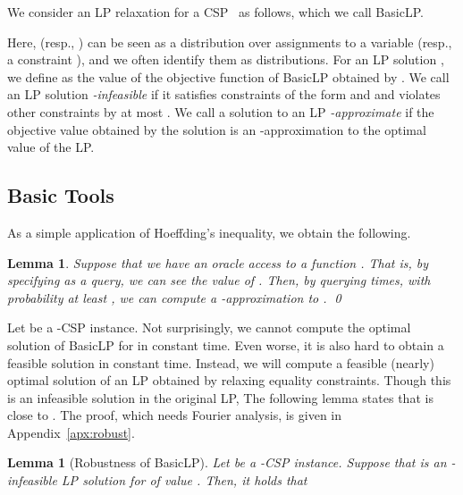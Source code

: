 \documentclass[letterpaper, 11pt]{article}
\newtheorem{lemma}[theorem]{Lemma}
\newcommand{\blp}{\textsf{BasicLP}\xspace}
\begin{document}
We consider an LP relaxation for a CSP~ as follows, which we call \blp.

Here,  (resp., ) can be seen as a distribution over assignments to a variable  (resp., a constraint ), 
and we often identify them as distributions.
For an LP solution ,
we define  as the value of the objective function of \blp obtained by .
We call an LP solution  \textit{-infeasible} if it satisfies constraints of the form  and  and violates other constraints by at most .
We call a solution to an LP \textit{-approximate} if the objective value obtained by the solution is an -approximation to the optimal value of the LP.

\subsection{Basic Tools}

As a simple application of Hoeffding's inequality, we obtain the following.
\begin{lemma}\label{lmm:stat}
  Suppose that we have an oracle access to a function .
  That is, by specifying  as a query, 
  we can see the value of .
  Then, by querying  times, 
  with probability at least , 
  we can compute a -approximation to .
  \qed
\end{lemma}

Let  be a -CSP instance.
Not surprisingly,
we cannot compute the optimal solution  of \blp for  in constant time.
Even worse, it is also hard to obtain a feasible solution in constant time.
Instead, we will compute a feasible (nearly) optimal solution  of an LP obtained by relaxing equality constraints.
Though this is an infeasible solution in the original LP,
The following lemma states that  is close to .
The proof, which needs Fourier analysis, is given in Appendix~\ref{apx:robust}.
\begin{lemma}[Robustness of \blp]\label{lmm:robust}
  Let  be a -CSP instance.
  Suppose that  is an -infeasible LP solution for  of value .
  Then, it holds that
  
\end{lemma}
\end{document}
